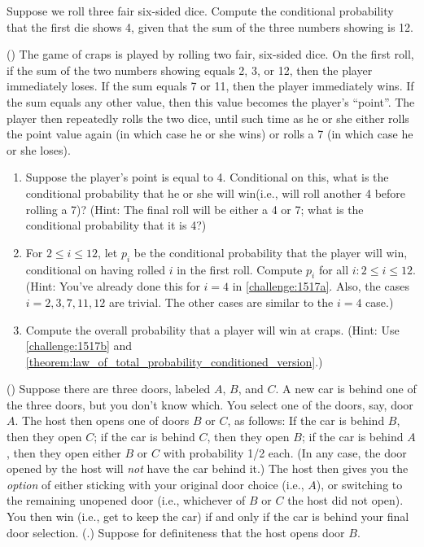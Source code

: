 \begin{challeges}
    \item Suppose we roll three fair six-sided dice. Compute the conditional probability that the first die shows 4, given that the sum of the three numbers showing is 12.
    \item () The game of craps is played by rolling two fair, six-sided dice. On the first roll, if the sum of the two numbers showing equals 2, 3, or 12, then the player immediately loses. If the sum equals 7 or 11, then the player immediately wins. If the sum equals any other value, then this value becomes the player's ``point''. The player then repeatedly rolls the two dice, until such time as he or she either rolls the point value again (in which case he or she wins) or rolls a 7 (in which case he or she loses).
        \begin{enumerate}
            \item \label{challenge:1517a}Suppose the player's point is equal to 4. Conditional on this, what is the conditional probability that he or she will win(i.e., will roll another 4 before rolling a 7)? (Hint: The final roll will be either a 4 or 7; what is the conditional probability that it is 4?)
            \item \label{challenge:1517b}For $2\leqslant i \leqslant 12$, let $p_i$ be the conditional probability that the player will win, conditional on having rolled $i$ in the first roll. Compute $p_i$ for all $i: 2 \leqslant i \leqslant 12$. (Hint: You've already done this for $i=4$ in \autoref{challenge:1517a}. Also, the cases $i=2,3,7,11,12$ are trivial. The other cases are similar to the $i=4$ case.)
            \item Compute the overall probability that a player will win at craps. (Hint: Use \autoref{challenge:1517b} and \autoref{theorem:law_of_total_probability_conditioned_version}.)
        \end{enumerate}
    \item \label{challenge:1518}() Suppose there are three doors, labeled $A$, $B$, and $C$. A new car is behind one of the three doors, but you don't know which. You select one of the doors, say, door $A$. The host then opens one of doors $B$ or $C$, as follows: If the car is behind $B$, then they open  $C$; if the car is behind $C$, then they open $B$; if the car is behind $A$, then they open either $B$ or $C$ with probability 1/2 each. (In any case, the door opened by the host will \emph{not} have the car behind it.) The host then gives you the \emph{option} of either sticking with your original door choice (i.e., $A$), or switching to the remaining unopened door (i.e., whichever of $B$ or $C$ the host did not open). You then win (i.e., get to keep the car) if and only if the car is behind your final door selection. (\cite{B2}.) Suppose for definiteness that the host opens door $B$.

\end{challeges}
